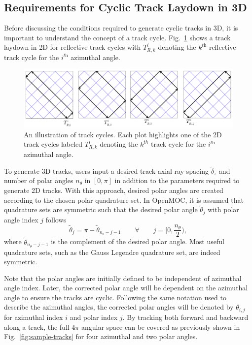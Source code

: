 \subsection{Requirements for Cyclic Track Laydown in 3D}

Before discussing the conditions required to generate cyclic tracks in 3D, it is important to understand the concept of a track cycle. Fig.~\ref{fig:tracks-cycles-2D} shows a track laydown in 2D for reflective track cycles with $T_{R,k}^{i}$ denoting the $k^{\textit{th}}$ reflective track cycle for the $i^{\textit{th}}$ azimuthal angle. 

\begin{figure}[h]
	\centering
	\includegraphics[width=6.5in]{figures/laydown/reflective-track-cycles-3.png}
	\caption{An illustration of track cycles. Each plot highlights one of the 2D track cycles labeled $T_{R,k}^{i}$ denoting the $k^{th}$ track cycle for the $i^{\textit{th}}$ azimuthal angle.}
	\label{fig:tracks-cycles-2D}
\end{figure}


To generate 3D tracks, users input a desired track axial ray spacing $\tilde{\delta}_z$ and number of polar angles $n_{\theta}$ in $[0, \pi]$ in addition to the parameters required to generate 2D tracks. With this approach, desired polar angles are created according to the chosen polar quadrature set. In OpenMOC, it is assumed that quadrature sets are symmetric such that the desired polar angle $\tilde{\theta}_{j}$ with polar angle index $j$ follows
\begin{equation}
\tilde{\theta}_{j} = \pi - \tilde{\theta}_{n_{\theta} - j - 1} \qquad \forall \qquad j= \Big[0,\frac{n_{\theta}}{2}\Big),
\end{equation} 
where $\tilde{\theta}_{n_{\theta} - j - 1}$ is the complement of the desired polar angle. Most useful quadrature sets, such as the Gauss Legendre quadrature set, are indeed symmetric. 

Note that the polar angles are initially defined to be independent of azimuthal angle index. Later, the corrected polar angle will be dependent on the azimuthal angle to ensure the tracks are cyclic. Following the same notation used to describe the azimuthal angles, the corrected polar angles will be denoted by $\theta_{i,j}$ for azimuthal index $i$ and polar index $j$. By tracking both forward and backward along a track, the full $4 \pi$ angular space can be covered as previously shown in Fig.~\ref{fig:sample-tracks} for four azimuthal and two polar angles.

